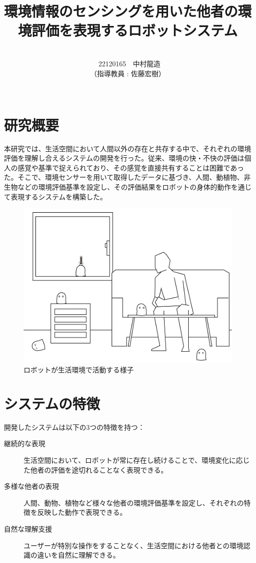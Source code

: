\documentclass[paper=a4paper,jafontsize=9pt,head_space=15mm,gutter=20mm,twocolumn,number_of_lines=49,
line_length=26zw]{myuarticle}
\begin{document}
\title{{\Large\bfseries\gtfamily 環境情報のセンシングを用いた他者の環境評価を表現するロボットシステム}}
\author{\\\ 22120165　中村龍造 \\（指導教員 : 佐藤宏樹）\\ \\}
\date{}
\maketitle

\section*{研究概要}
本研究では、生活空間において人間以外の存在と共存する中で、それぞれの環境評価を理解し合えるシステムの開発を行った。従来、環境の快・不快の評価は個人の感覚や基準で捉えられており、その感覚を直接共有することは困難であった。そこで、環境センサーを用いて取得したデータに基づき、人間、動植物、非生物などの環境評価基準を設定し、その評価結果をロボットの身体的動作を通じて表現するシステムを構築した。

\begin{figure}[h]
  \centering
  \includegraphics[keepaspectratio,width=0.6\columnwidth]{resources/robot-in-howse.jpg}
  \caption[short]{ロボットが生活環境で活動する様子}
  \label{fig:robot-in-house}
\end{figure}

\section*{システムの特徴}
開発したシステムは以下の3つの特徴を持つ：

\begin{description}
  \item [継続的な表現]生活空間において、ロボットが常に存在し続けることで、環境変化に応じた他者の評価を途切れることなく表現できる。
  \item [多様な他者の表現]人間、動物、植物など様々な他者の環境評価基準を設定し、それぞれの特徴を反映した動作で表現できる。
  \item [自然な理解支援]ユーザーが特別な操作をすることなく、生活空間における他者との環境認識の違いを自然に理解できる。
\end{description}
\end{document}
